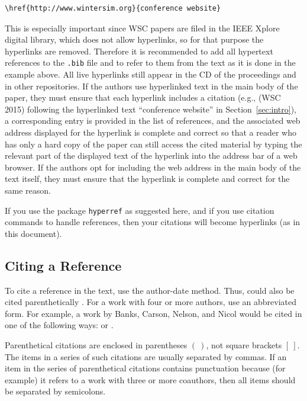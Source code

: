 \documentclass{wscpaperproc}
\theoremstyle{wsc}
\begin{document}
\begin{verbatim}
\href{http://www.wintersim.org}{conference website}
\end{verbatim}\vspace{5 mm}


\noindent This is especially important since WSC papers are filed in the IEEE Xplore digital library, which does not allow hyperlinks, so for that purpose the hyperlinks are removed.
Therefore it is recommended to add all hypertext references to the {\tt .bib} file and to refer to them from the text as it is done in the example above.
All live hyperlinks still appear in the CD of the proceedings and in other repositories.
If the authors use hyperlinked text in the main body of the paper, they must ensure that each hyperlink includes a citation (e.g., (WSC 2015) following the hyperlinked text ``conference website'' in Section~\ref{sec:intro}), a corresponding entry is provided in the list of references, and the associated web address displayed for the hyperlink is complete and correct so that a reader who has only a hard copy of the paper can still access the cited material by typing the relevant part of the displayed text of the hyperlink into the address bar of a web browser.
If the authors opt for including the web address in the main body of the text itself, they must ensure that the hyperlink is complete and correct for the same reason.

If you use the package {\tt hyperref} as suggested here, and if you use citation commands to handle references, then your citations will
become hyperlinks (as in this document).

\subsection{Citing a Reference}
To cite a reference in the text, use the author-date method. Thus,  could also be cited parenthetically \cite{chi89}.
For a work with four or more authors, use an abbreviated form. For example, a work by Banks, Carson, Nelson, and Nicol would be cited in one of the
following ways:
 or .

Parenthetical citations are enclosed in parentheses $(~)$, not square brackets $[~]$.
The items in a series of such citations are usually separated by commas.
If an item in the series of parenthetical citations contains punctuation because (for example) it refers to a work with three or more coauthors, then all items should be separated by semicolons.
\end{document}
